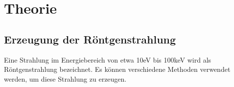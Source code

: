 \section{Theorie}
\label{sec:Theorie}

\cite{sample}

\subsection{Erzeugung der Röntgenstrahlung}

Eine Strahlung im Energiebereich von etwa 10eV bis 100keV wird als Röntgenstrahlung
bezeichnet. Es können verschiedene Methoden verwendet werden, um diese Strahlung 
zu erzeugen. 

